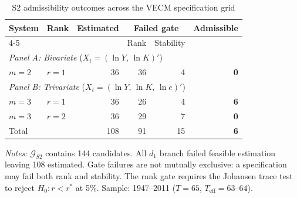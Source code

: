 
\begin{table}[htbp]
\centering
\small
\caption{S2 admissibility outcomes across the VECM specification grid}
\label{tab:S2_admissibility}
\begin{threeparttable}
\begin{tabular}{llrrrr}
\toprule
System & Rank & Estimated & \multicolumn{2}{c}{Failed gate} & Admissible \\
\cmidrule(lr){4-5}
       &      &           & Rank & Stability &            \\
\midrule
\multicolumn{6}{l}{\textit{Panel A: Bivariate} ($X_t = (\ln Y,\, \ln K)'$)} \\[4pt]
$m = 2$ & $r = 1$ & 36 & 36 & 4 & \textbf{0} \\[6pt]
\multicolumn{6}{l}{\textit{Panel B: Trivariate} ($X_t = (\ln Y,\, \ln K,\, \ln e)'$)} \\[4pt]
$m = 3$ & $r = 1$ & 36 & 26 & 4 & \textbf{6} \\
$m = 3$ & $r = 2$ & 36 & 29 & 7 & \textbf{0} \\[4pt]
\midrule
\multicolumn{2}{l}{Total} & 108 & 91 & 15 & \textbf{6} \\
\bottomrule
\end{tabular}
\begin{tablenotes}
\footnotesize
\item \textit{Notes:} $\mathcal{G}_{S2}$ contains
    144 candidates. All $d_1$ branch failed feasible estimation leaving 108 estimated. 
    Gate failures are not mutually exclusive: a specification may fail both rank and stability.
    The rank gate requires the Johansen trace test to reject
    $H_0\!: r < r^*$ at 5\%.
    Sample: 1947--2011 ($T = 65$, $T_{\text{eff}} = 63$--$64$).
\end{tablenotes}
\end{threeparttable}
\end{table}
